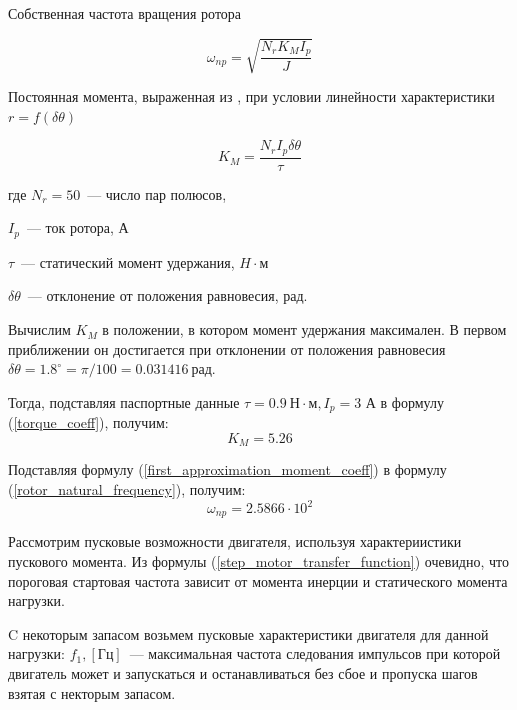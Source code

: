 Собственная частота вращения ротора \cite[гл. 4.2, ф-ла 4.48]{Kenio}

\begin{equation}
    \label{rotor_natural_frequency}
    \omega_{np} = \sqrt{\frac{N_{r}K_{M}I_{p}}{J}}
\end{equation}

Постоянная момента, выраженная из \cite[гл. 4.2, ф-ла 4.52]{Kenio}, при условии
линейности характеристики $r = f(\delta\theta)$

\begin{equation}
    \label{torque_coeff}
    K_{M} = \frac{N_{r}I_{p}\delta\theta}{\tau}
\end{equation}

где $N_{r} = 50$~--- число пар полюсов,

$I_{p}$~--- ток ротора, А

$\tau$~--- статический момент удержания, $H \cdot \textit{м}$

$\delta\theta$~--- отклонение от положения равновесия, рад.

Вычислим $K_{M}$ в положении, в котором момент удержания максимален.
В первом приближении он достигается при отклонении от положения равновесия
$\delta\theta = 1.8^{\circ} = \pi/100 = 0.031416 ~\textit{рад}$.

Тогда, подставляя паспортные данные $\tau = 0.9 ~\textit{Н} \cdot \textit{м}, I_{p} = 3$ А
в формулу (\ref{torque_coeff}), получим:
\begin{equation}
    \label{first_approximation_moment_coeff}
    K_{M} = 5.26
\end{equation}

Подставляя формулу (\ref{first_approximation_moment_coeff})
в формулу (\ref{rotor_natural_frequency}), получим:
\begin{equation}
    \label{first_approximation_rotor_natural_frequency}
    \omega_{np} = 2.5866 \cdot 10^{2}
\end{equation}

Рассмотрим пусковые возможности двигателя, используя характериистики пускового
момента. Из формулы (\ref{step_motor_transfer_function}) очевидно, что пороговая
стартовая частота зависит от момента инерции и статического момента нагрузки.

C некоторым запасом возьмем пусковые характеристики двигателя для данной нагрузки:
$f_{1}, [\textit{Гц}]$~--- максимальная частота следования импульсов при которой двигатель может и
запускаться и останавливаться без сбое и пропуска шагов взятая с некторым запасом.

